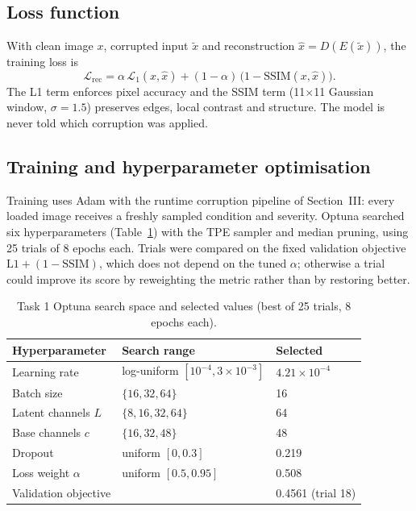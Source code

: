 \documentclass[conference]{IEEEtran}
\begin{document}
\subsection{Loss function}
With clean image $x$, corrupted input $\tilde{x}$ and reconstruction $\hat{x} = D(E(\tilde{x}))$, the training loss is
\begin{equation}
\mathcal{L}_{\text{rec}} = \alpha\, \mathcal{L}_{1}(x, \hat{x}) + (1-\alpha)\,\bigl(1 - \text{SSIM}(x, \hat{x})\bigr).
\label{eq:t1_loss}
\end{equation}
The L1 term enforces pixel accuracy and the SSIM term \cite{wang2004} (11$\times$11 Gaussian window, $\sigma = 1.5$) preserves edges, local contrast and structure. The model is never told which corruption was applied.

\subsection{Training and hyperparameter optimisation}
\label{sec:t1_optuna}
Training uses Adam with the runtime corruption pipeline of Section~III: every loaded image receives a freshly sampled condition and severity. Optuna \cite{akiba2019} searched six hyperparameters (Table~\ref{tab:t1_optuna}) with the TPE sampler \cite{bergstra2011} and median pruning, using 25 trials of 8 epochs each. Trials were compared on the fixed validation objective $\text{L1} + (1-\text{SSIM})$, which does not depend on the tuned $\alpha$; otherwise a trial could improve its score by reweighting the metric rather than by restoring better.

\begin{table}[t]
\centering
\caption{Task 1 Optuna search space and selected values (best of 25 trials, 8 epochs each).}
\label{tab:t1_optuna}
\footnotesize
\begin{tabular}{@{}lll@{}}
\toprule
Hyperparameter & Search range & Selected \\
\midrule
Learning rate & log-uniform $[10^{-4}, 3\times10^{-3}]$ & $4.21\times10^{-4}$ \\
Batch size & $\{16, 32, 64\}$ & 16 \\
Latent channels $L$ & $\{8, 16, 32, 64\}$ & 64 \\
Base channels $c$ & $\{16, 32, 48\}$ & 48 \\
Dropout & uniform $[0, 0.3]$ & 0.219 \\
Loss weight $\alpha$ & uniform $[0.5, 0.95]$ & 0.508 \\
\midrule
Validation objective & & 0.4561 (trial 18) \\
\bottomrule
\end{tabular}
\end{table}
\end{document}
